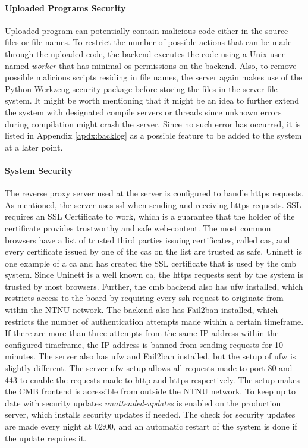 \paragraph*{Uploaded Programs Security} Uploaded program can potentially contain malicious code either in the source files or file names. To restrict the number of possible actions that can be made through the uploaded code, the backend executes the code using a Unix user named \textit{worker} that has minimal \gls{os} permissions on the backend. Also, to remove possible malicious scripts residing in file names, the server again makes use of the Python Werkzeug security package \cite{WERKZEUG} before storing the files in the server file system. It might be worth mentioning that it might be an idea to further extend the system with designated compile servers or threads since unknown errors during compilation might crash the server. Since no such error has occurred, it is listed in Appendix \ref{apdx:backlog} as a possible feature to be added to the system at a later point.

\paragraph*{System Security} The reverse proxy server used at the server is configured to handle \gls{https} requests. As mentioned, the server uses \gls{ssl} when sending and receiving \gls{https} requests. SSL requires an SSL Certificate to work, which is a guarantee that the holder of the certificate provides trustworthy and safe web-content. The most common browsers have a list of trusted third parties issuing certificates, called \gls{cas}, and every certificate issued by one of the \gls{cas} on the list are trusted as safe. Uninett is one example of a \gls{ca} and has created the SSL certificate that is used by the \gls{cmb} system. Since Uninett is a well known \gls{ca}, the \gls{https} requests sent by the system is trusted by most browsers. Further, the \gls{cmb} backend also has \gls{ufw} \cite{UFW} installed, which restricts access to the board by requiring every \gls{ssh} request to originate from within the NTNU network. The backend also has Fail2ban  \cite{FAIL2BAN} installed, which restricts the number of authentication attempts made within a certain timeframe. If there are more than three attempts from the same IP-address within the configured timeframe, the IP-address is banned from sending requests for 10 minutes. The server also has \gls{ufw} and Fail2ban installed, but the setup of \gls{ufw} is slightly different. The server \gls{ufw} setup allows all requests made to port 80 and 443 to enable the requests made to \gls{http} and \gls{https} respectively. The setup makes the CMB frontend is accessible from outside the NTNU network. To keep up to date with security updates \textit{unattended-updates} \cite{UNATTENDED} is enabled on the production server, which installs security updates if needed. The check for security updates are made every night at 02:00, and an automatic restart of the system is done if the update requires it.

